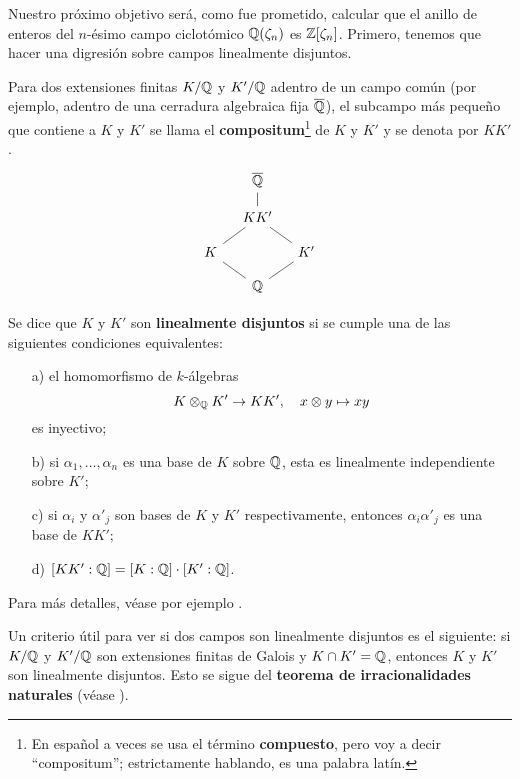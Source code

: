 Nuestro próximo objetivo será, como fue prometido, calcular que el anillo de
enteros del $n$-ésimo campo ciclotómico $\mathbb{Q} (\zeta_n)$ es
$\mathbb{Z} [\zeta_n]$. Primero, tenemos que hacer una digresión sobre campos
linealmente disjuntos.

\begin{definicion}
  Para dos extensiones finitas $K/\mathbb{Q}$ y $K'/\mathbb{Q}$ adentro de un campo común
  (por ejemplo, adentro de una cerradura algebraica fija $\overline{\mathbb{Q}}$),
  el subcampo más pequeño que contiene a $K$ y $K'$ se llama el
  \textbf{compositum}\footnote{En español a veces se usa el término
    \textbf{compuesto}, pero voy a decir ``compositum''; estrictamente hablando,
    es una palabra latín.} de $K$ y $K'$ y se denota por $K K'$.
  \[ \begin{tikzcd}[row sep=1em,column sep=1em]
    & \overline{\QQ}\ar[-]{d} \\
    & KK'\ar[-]{dl}\ar[-]{dr} \\
    K\ar[-]{dr} & & K'\ar[-]{dl} \\
    & \QQ
  \end{tikzcd} \]

  Se dice que $K$ y $K'$ son \textbf{linealmente disjuntos} si se cumple una
  de las siguientes condiciones equivalentes:
  \begin{enumerate}
  \item[a)] el homomorfismo de $k$-álgebras
    $$K\otimes_{\mathbb{Q}} K'\to K K', \quad x\otimes y \mapsto xy$$
    es inyectivo;

  \item[b)] si $\alpha_1, \ldots, \alpha_n$ es una base de $K$ sobre $\mathbb{Q}$, esta
    es linealmente independiente sobre $K'$;

  \item[c)] si $\alpha_i$ y $\alpha'_j$ son bases de $K$ y $K'$ respectivamente,
    entonces $\alpha_i \alpha'_j$ es una base de $K K'$;

  \item[d)] $[KK' : \mathbb{Q}] = [K : \mathbb{Q}]\cdot [K' : \mathbb{Q}]$.
  \end{enumerate}
\end{definicion}

Para más detalles, véase por ejemplo \cite[Chapter~V, \S~20]{Morandi-GTM167}.

\begin{comentario}
  Un criterio útil para ver si dos campos son linealmente disjuntos es
  el siguiente: si $K/\mathbb{Q}$ y $K'/\mathbb{Q}$ son extensiones finitas de Galois y
  $K \cap K' = \mathbb{Q}$, entonces $K$ y $K'$ son linealmente disjuntos.
  Esto se sigue del \textbf{teorema de irracionalidades naturales}
  (véase \cite[Chapter~I, Theorem~5.5]{Morandi-GTM167}).
\end{comentario}


